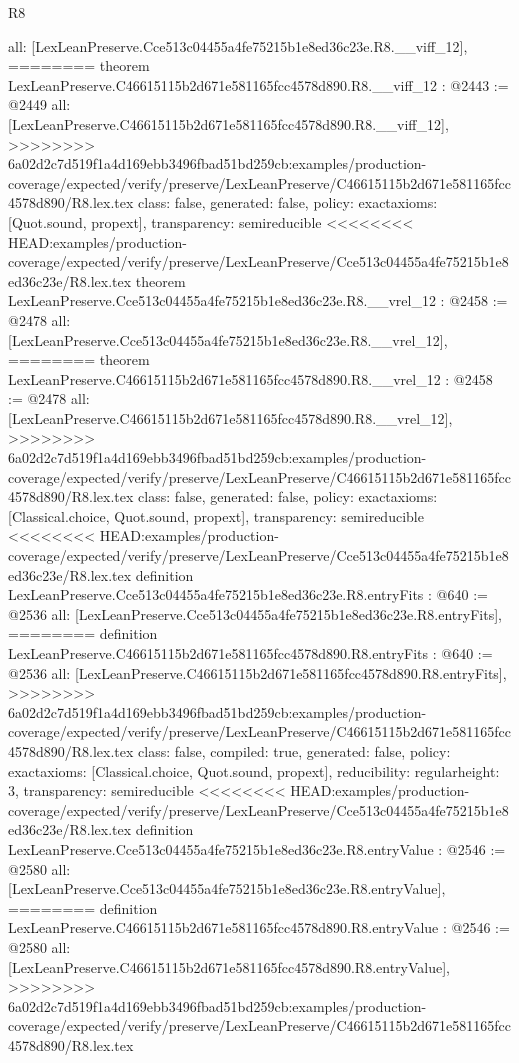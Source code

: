\begin{lexlean}{R8}
\begin{coremodule}
{{{{{{{{{{{{{{{{{{{{{{{{{{{{{{{{  all: [LexLeanPreserve.Cce513c04455a4fe75215b1e8ed36c23e.R8.__viff_12],
========
theorem LexLeanPreserve.C46615115b2d671e581165fcc4578d890.R8.__viff_12 : @2443 := @2449 {
  all: [LexLeanPreserve.C46615115b2d671e581165fcc4578d890.R8.__viff_12],
>>>>>>>> 6a02d2c7d519f1a4d169ebb3496fbad51bd259cb:examples/production-coverage/expected/verify/preserve/LexLeanPreserve/C46615115b2d671e581165fcc4578d890/R8.lex.tex
  class: false,
  generated: false,
  policy: exact{axioms: [Quot.sound, propext]},
  transparency: semireducible
}
<<<<<<<< HEAD:examples/production-coverage/expected/verify/preserve/LexLeanPreserve/Cce513c04455a4fe75215b1e8ed36c23e/R8.lex.tex
theorem LexLeanPreserve.Cce513c04455a4fe75215b1e8ed36c23e.R8.__vrel_12 : @2458 := @2478 {
  all: [LexLeanPreserve.Cce513c04455a4fe75215b1e8ed36c23e.R8.__vrel_12],
========
theorem LexLeanPreserve.C46615115b2d671e581165fcc4578d890.R8.__vrel_12 : @2458 := @2478 {
  all: [LexLeanPreserve.C46615115b2d671e581165fcc4578d890.R8.__vrel_12],
>>>>>>>> 6a02d2c7d519f1a4d169ebb3496fbad51bd259cb:examples/production-coverage/expected/verify/preserve/LexLeanPreserve/C46615115b2d671e581165fcc4578d890/R8.lex.tex
  class: false,
  generated: false,
  policy: exact{axioms: [Classical.choice, Quot.sound, propext]},
  transparency: semireducible
}
<<<<<<<< HEAD:examples/production-coverage/expected/verify/preserve/LexLeanPreserve/Cce513c04455a4fe75215b1e8ed36c23e/R8.lex.tex
definition LexLeanPreserve.Cce513c04455a4fe75215b1e8ed36c23e.R8.entryFits : @640 := @2536 {
  all: [LexLeanPreserve.Cce513c04455a4fe75215b1e8ed36c23e.R8.entryFits],
========
definition LexLeanPreserve.C46615115b2d671e581165fcc4578d890.R8.entryFits : @640 := @2536 {
  all: [LexLeanPreserve.C46615115b2d671e581165fcc4578d890.R8.entryFits],
>>>>>>>> 6a02d2c7d519f1a4d169ebb3496fbad51bd259cb:examples/production-coverage/expected/verify/preserve/LexLeanPreserve/C46615115b2d671e581165fcc4578d890/R8.lex.tex
  class: false,
  compiled: true,
  generated: false,
  policy: exact{axioms: [Classical.choice, Quot.sound, propext]},
  reducibility: regular{height: 3},
  transparency: semireducible
}
<<<<<<<< HEAD:examples/production-coverage/expected/verify/preserve/LexLeanPreserve/Cce513c04455a4fe75215b1e8ed36c23e/R8.lex.tex
definition LexLeanPreserve.Cce513c04455a4fe75215b1e8ed36c23e.R8.entryValue : @2546 := @2580 {
  all: [LexLeanPreserve.Cce513c04455a4fe75215b1e8ed36c23e.R8.entryValue],
========
definition LexLeanPreserve.C46615115b2d671e581165fcc4578d890.R8.entryValue : @2546 := @2580 {
  all: [LexLeanPreserve.C46615115b2d671e581165fcc4578d890.R8.entryValue],
>>>>>>>> 6a02d2c7d519f1a4d169ebb3496fbad51bd259cb:examples/production-coverage/expected/verify/preserve/LexLeanPreserve/C46615115b2d671e581165fcc4578d890/R8.lex.tex
}}}}}}}}}}}}}}}}}}}}}}}}}}}}}}}}}}}}
\end{coremodule}
\end{lexlean}
